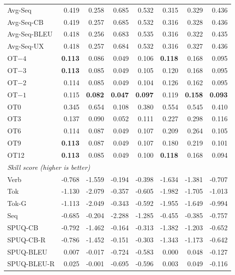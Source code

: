 {\begin{longtable}{@{}lrrrrrrr@{}}
\addlinespace
Avg-Seq & 0.419 & 0.258 & 0.685 & 0.532 & 0.315 & 0.329 & 0.436 \\
Avg-Seq-CB & 0.419 & 0.257 & 0.685 & 0.532 & 0.316 & 0.328 & 0.436 \\
Avg-Seq-BLEU & 0.418 & 0.256 & 0.683 & 0.535 & 0.316 & 0.322 & 0.435 \\
Avg-Seq-UX & 0.418 & 0.257 & 0.684 & 0.532 & 0.316 & 0.327 & 0.436 \\
\addlinespace
OT$-4$ & \textbf{0.113} & 0.086 & 0.049 & 0.106 & \textbf{0.118} & 0.168 & 0.095 \\
OT$-3$ & \textbf{0.113} & 0.085 & 0.049 & 0.105 & 0.120 & 0.168 & 0.095 \\
OT$-2$ & 0.114 & 0.085 & 0.049 & 0.104 & 0.126 & 0.162 & 0.095 \\
OT$-1$ & 0.115 & \textbf{0.082} & \textbf{0.047} & \textbf{0.097} & 0.119 & \textbf{0.158} & \textbf{0.093} \\
OT0 & 0.345 & 0.654 & 0.108 & 0.380 & 0.554 & 0.545 & 0.410 \\
OT3 & 0.137 & 0.090 & 0.052 & 0.111 & 0.227 & 0.298 & 0.116 \\
OT6 & 0.114 & 0.087 & 0.049 & 0.107 & 0.209 & 0.264 & 0.105 \\
OT9 & \textbf{0.113} & 0.087 & 0.049 & 0.107 & 0.180 & 0.219 & 0.101 \\
OT12 & \textbf{0.113} & 0.085 & 0.049 & 0.100 & \textbf{0.118} & 0.168 & 0.094 \\
\midrule
\multicolumn{8}{l}{\textit{Skill score (higher is better)}} \\
\midrule
Verb & -0.768 & -1.559 & -0.194 & -0.398 & -1.634 & -1.381 & -0.707 \\
\addlinespace
Tok & -1.130 & -2.079 & -0.357 & -0.605 & -1.982 & -1.705 & -1.013 \\
Tok-G & -1.113 & -2.049 & -0.343 & -0.592 & -1.955 & -1.649 & -0.994 \\
\addlinespace
Seq & -0.685 & -0.204 & -2.288 & -1.285 & -0.455 & -0.385 & -0.757 \\
\addlinespace
SPUQ-CB & -0.792 & -1.462 & -0.164 & -0.313 & -1.382 & -1.203 & -0.652 \\
SPUQ-CB-R & -0.786 & -1.452 & -0.151 & -0.303 & -1.343 & -1.173 & -0.642 \\
SPUQ-BLEU & \phantom{-}0.007 & -0.017 & -0.724 & -0.583 & \phantom{-}0.000 & \phantom{-}0.048 & -0.127 \\
SPUQ-BLEU-R & \phantom{-}0.025 & -0.001 & -0.695 & -0.596 & \phantom{-}0.003 & \phantom{-}0.049 & -0.116 \\

\end{longtable}}

